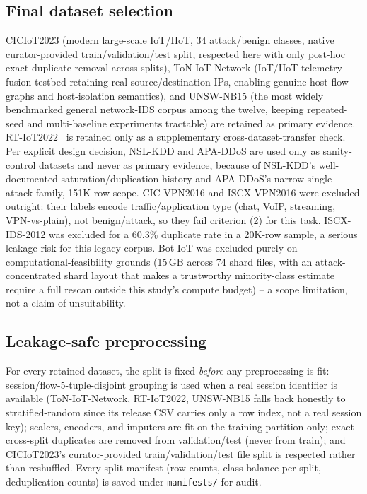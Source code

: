 \documentclass[journal]{IEEEtran}
\begin{document}
\subsection{Final dataset selection}
CICIoT2023 (modern large-scale IoT/IIoT, 34 attack/benign classes, native
curator-provided train/validation/test split, respected here with only
post-hoc exact-duplicate removal across splits), ToN-IoT-Network
(IoT/IIoT telemetry-fusion testbed retaining real source/destination IPs,
enabling genuine host-flow graphs and host-isolation semantics), and
UNSW-NB15 (the most widely benchmarked general network-IDS corpus among the
twelve, keeping repeated-seed and multi-baseline experiments tractable) are
retained as primary evidence. RT-IoT2022~\cite{sharmila2023rtiot2022} is
retained only as a supplementary cross-dataset-transfer check. Per explicit design decision, NSL-KDD and
APA-DDoS are used only as sanity-control datasets and never as primary
evidence, because of NSL-KDD's well-documented saturation/duplication history
and APA-DDoS's narrow single-attack-family, 151K-row scope. CIC-VPN2016 and
ISCX-VPN2016 were excluded outright: their labels encode traffic/application
type (chat, VoIP, streaming, VPN-vs-plain), not benign/attack, so they fail
criterion (2) for this task. ISCX-IDS-2012 was excluded for a 60.3\% duplicate
rate in a 20K-row sample, a serious leakage risk for this legacy corpus.
Bot-IoT was excluded purely on computational-feasibility grounds (15\,GB
across 74 shard files, with an attack-concentrated shard layout that makes a
trustworthy minority-class estimate require a full rescan outside this
study's compute budget) -- a scope limitation, not a claim of unsuitability.



\subsection{Leakage-safe preprocessing}
For every retained dataset, the split is fixed \emph{before} any
preprocessing is fit: session/flow-5-tuple-disjoint grouping is used when a
real session identifier is available (ToN-IoT-Network, RT-IoT2022, UNSW-NB15
falls back honestly to stratified-random since its release CSV carries only a
row index, not a real session key); scalers, encoders, and imputers are fit
on the training partition only; exact cross-split duplicates are removed from
validation/test (never from train); and CICIoT2023's curator-provided
train/validation/test file split is respected rather than reshuffled. Every
split manifest (row counts, class balance per split, deduplication counts) is
saved under \texttt{manifests/} for audit.
\end{document}
